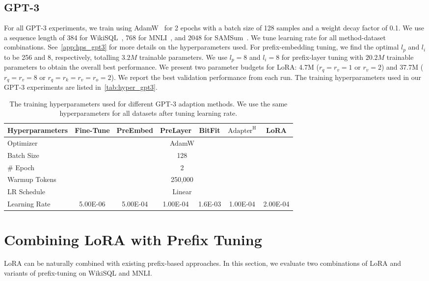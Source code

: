 \documentclass{article} %
\begin{document}
\subsection{GPT-3}
\label{app:hps_gpt3}
For all GPT-3 experiments, we train using AdamW~\citep{loshchilov2017decoupled} for 2 epochs with a batch size of 128 samples and a weight decay factor of 0.1.
We use a sequence length of 384 for WikiSQL~\citep{DBLP:journals/corr/abs-1709-00103}, 768 for MNLI~\citep{williams-etal-2018-broad}, and 2048 for SAMSum~\citep{DBLP:journals/corr/abs-1911-12237}.
We tune learning rate for all method-dataset combinations.
See~\autoref{app:hps_gpt3} for more details on the hyperparameters used.
For prefix-embedding tuning, we find the optimal $l_p$ and $l_i$ to be 256 and 8, respectively, totalling $3.2M$ trainable parameters. 
We use $l_p=8$ and $l_i=8$ for prefix-layer tuning with $20.2M$ trainable parameters to obtain the overall best performance.
We present two parameter budgets for LoRA: 4.7M ($r_q=r_v=1$ or $r_{v}=2$) and 37.7M ($r_q=r_v=8$ or $r_q=r_k=r_v=r_o=2$).
We report the best validation performance from each run.
The training hyperparameters used in our GPT-3 experiments are listed in~\autoref{tab:hyper_gpt3}.
\begin{table}[h]
\centering
\begin{tabular}{l|cccccc}
\hline
\toprule
Hyperparameters & Fine-Tune & PreEmbed & PreLayer & BitFit & $\text{Adapter}^\text{H}$ & LoRA \\
\midrule
Optimizer & \multicolumn{6}{c}{AdamW} \\
Batch Size   & \multicolumn{6}{c}{128} \\
\# Epoch & \multicolumn{6}{c}{2} \\
Warmup Tokens & \multicolumn{6}{c}{250,000} \\
LR Schedule & \multicolumn{6}{c}{Linear} \\
\midrule
Learning Rate & 5.00E-06 & 5.00E-04 & 1.00E-04 & 1.6E-03 & 1.00E-04 & 2.00E-04 \\

\bottomrule
\end{tabular}
\caption{The training hyperparameters used for different GPT-3 adaption methods. We use the same hyperparameters for all datasets after tuning learning rate.}
\label{tab:hyper_gpt3}
\end{table}


\section{Combining LoRA with Prefix Tuning}
\label{app:lora_plus}
LoRA can be naturally combined with existing prefix-based approaches.
In this section, we evaluate two combinations of LoRA and variants of prefix-tuning on WikiSQL and MNLI.
\end{document}
